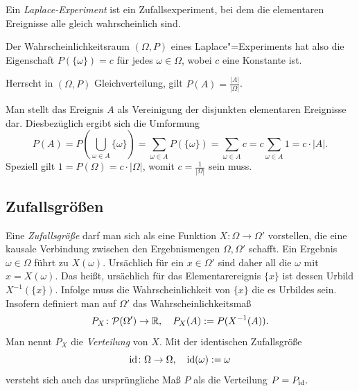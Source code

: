 \begin{Definition}\newlinefirst
Ein \emph{Laplace-Experiment} ist ein
Zufallsexperiment, bei dem die elementaren Ereignisse alle gleich
wahrscheinlich sind.
\end{Definition}

\noindent
Der Wahrscheinlichkeitsraum $(\Omega,P)$ eines Laplace"=Experiments
hat also die Eigenschaft $P(\{\omega\})=c$ für jedes $\omega\in\Omega$,
wobei $c$ eine Konstante ist.

\begin{Satz}
Herrscht in $(\Omega,P)$ Gleichverteilung, gilt $P(A) = \frac{|A|}{|\Omega|}$.
\end{Satz}
\begin{Beweis}
Man stellt das Ereignis $A$ als Vereinigung der disjunkten elementaren
Ereignisse dar. Diesbezüglich ergibt sich die Umformung
\[P(A) = P(\bigcup_{\omega\in A}\{\omega\})
= \sum_{\omega\in A}P(\{\omega\}) = \sum_{\omega\in A} c
= c\sum_{\omega\in A} 1 = c\cdot |A|.\]
Speziell gilt $1=P(\Omega)=c\cdot |\Omega|$, womit
$c=\frac{1}{|\Omega|}$ sein muss.\,\qedsymbol
\end{Beweis}

\subsection{Zufallsgrößen}

Eine \emph{Zufallsgröße} darf man
sich als eine Funktion $X\colon\Omega\to\Omega'$
vorstellen, die eine kausale Verbindung zwischen den Ergebnismengen
$\Omega,\Omega'$ schafft. Ein Ergebnis $\omega\in\Omega$ führt
zu $X(\omega)$. Ursächlich für ein $x\in\Omega'$ sind daher all die
$\omega$ mit $x=X(\omega)$. Das heißt, ursächlich für das
Elementarereignis $\{x\}$ ist dessen Urbild $X^{-1}(\{x\})$.
Infolge muss die Wahrscheinlichkeit von $\{x\}$ die es Urbildes sein.
Insofern definiert man auf $\Omega'$ das Wahrscheinlichkeitsmaß%
\[P_X\colon\mathcal P(\Omega')\to\mathbb R,\quad P_X(A) := P(X^{-1}(A)).\]
Man nennt $P_X$ die \emph{Verteilung} von $X$. Mit der
identischen Zufallsgröße
\[\operatorname{id}\colon\Omega\to\Omega,\quad \operatorname{id}(\omega) := \omega\]
versteht sich auch das ursprüngliche Maß $P$ als die Verteilung $P=P_{\operatorname{id}}$.

